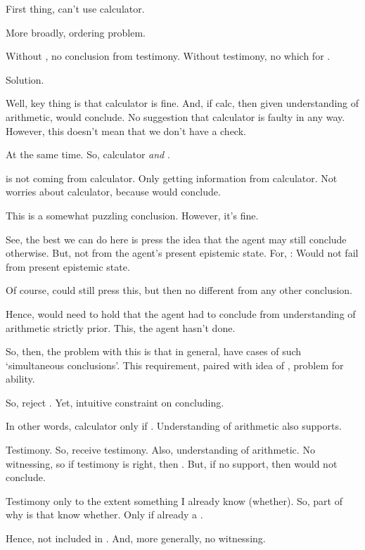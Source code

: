 \begin{note}
  {
    \color{blue}
    First thing, can't use calculator.

    More broadly, ordering problem.

    Without , no conclusion from testimony.
    Without testimony, no which for .
  }

  {
    \color{red}
    Solution.

    Well, key thing is that calculator is fine.
    And, if calc, then given understanding of arithmetic, would conclude.
    No suggestion that calculator is faulty in any way.
    However, this doesn't mean that we don't have a check.

    At the same time.
    So, calculator \emph{and} \fc{}.

    \fc{} is not coming from calculator.
    Only getting information from calculator.
    Not worries about calculator, because would conclude.

    This is a somewhat puzzling conclusion.
    However, it's fine.

    See, the best we can do here is press the idea that the agent may still conclude otherwise.
    But, not from the agent's present epistemic state.
    For, : Would not fail from present epistemic state.

    Of course, could still press this, but then no different from any other conclusion.

    Hence, would need to hold that the agent had to conclude from understanding of arithmetic strictly prior.
    This, the agent hasn't done.

    So, then, the problem with this is that in general, have cases of such `simultaneous conclusions'.
    This requirement, paired with idea of \zS{}, problem for ability.

    So, reject \zS{}.
    Yet, intuitive constraint on concluding.
    }

  In other words, calculator only if .
  Understanding of arithmetic also supports.

  Testimony.
  So, receive testimony.
  Also, understanding of arithmetic.
  No witnessing, so if testimony is right, then .
  But, if no support, then would not conclude.

  Testimony only to the extent something I already know (whether).
  So, part of why is that know whether.
  Only if already a .

  Hence, \qWhy{} not included in \qHow{}.
  And, more generally, no witnessing.


\end{note}
